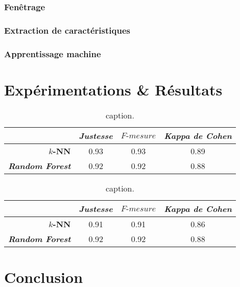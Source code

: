 \subsubsection{Fenêtrage}

\subsubsection{Extraction de caractéristiques}

\subsubsection{Apprentissage machine}

\section{Expérimentations \& Résultats}

\begin{table}[H]
    \centering
    \caption{caption.}
    \label{tab:previous_results}
    \begin{tabular}{@{}rccc@{}}
      \toprule
      \multicolumn{1}{l}{}              & \textit{Justesse}  &  $F\mbox{-} mesure$  & \textit{Kappa de Cohen}  \\ \midrule
      \textbf{$k$-NN}                   & 0.93               & 0.93                 & 0.89                     \\
      \textbf{\textit{Random Forest}}   & 0.92               & 0.92                 & 0.88                     \\ \bottomrule
    \end{tabular}
\end{table}

\begin{table}[H]
    \centering
    \caption{caption.}
    \label{tab:l2ml_results}
    \begin{tabular}{@{}rccc@{}}
      \toprule
      \multicolumn{1}{l}{}              & \textit{Justesse}  &  $F\mbox{-} mesure$  & \textit{Kappa de Cohen}  \\ \midrule
      \textbf{$k$-NN}                   & 0.91               & 0.91                 & 0.86                     \\
      \textbf{\textit{Random Forest}}   & 0.92               & 0.92                 & 0.88                     \\ \bottomrule
    \end{tabular}
\end{table}

\section{Conclusion}
